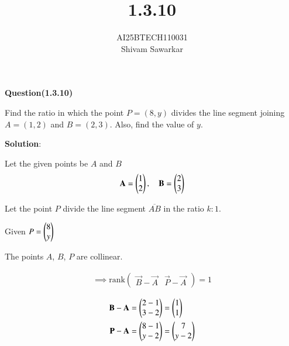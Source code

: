 \documentclass[journal]{IEEEtran}
\begin{document}

\vspace{3cm}

\title{1.3.10}
\author{AI25BTECH110031 \\ Shivam Sawarkar}
 \maketitle
{\let\newpage\relax\maketitle}

\renewcommand{\thefigure}{\theenumi}
\renewcommand{\thetable}{\theenumi}
\setlength{\intextsep}{10pt} %


\renewcommand{\thetable}{\theenumi}

\textbf{Question(1.3.10)}

Find the ratio in which the point $P = (8, y)$ divides the line segment joining
$A = (1, 2)$ and $B = (2, 3)$. Also, find the value of $y$.

\textbf{Solution}:

Let the given points be $A$ and $B$
\begin{align*}
\mathbf{A} = \begin{pmatrix}1 \\ 2\end{pmatrix}, \quad \mathbf{B} = \begin{pmatrix}2 \\ 3\end{pmatrix}
\end{align*}

Let the point $P$ divide the line segment $\overline{AB}$ in the ratio $k:1$.

Given $P = \begin{pmatrix}8 \\ y\end{pmatrix}$

The points $A$, $B$, $P$ are collinear.

\begin{align}
\implies \text{rank} \begin{pmatrix} \vec{B}-\vec{A} & \vec{P}-\vec{A} \end{pmatrix} = 1
\end{align}

\begin{align}
\mathbf{B}-\mathbf{A} &= \begin{pmatrix}2-1 \\ 3-2\end{pmatrix} = \begin{pmatrix}1 \\ 1\end{pmatrix} \\
\mathbf{P}-\mathbf{A} &= \begin{pmatrix}8-1 \\ y-2\end{pmatrix} = \begin{pmatrix}7 \\ y-2\end{pmatrix}
\end{align}
\end{document}
